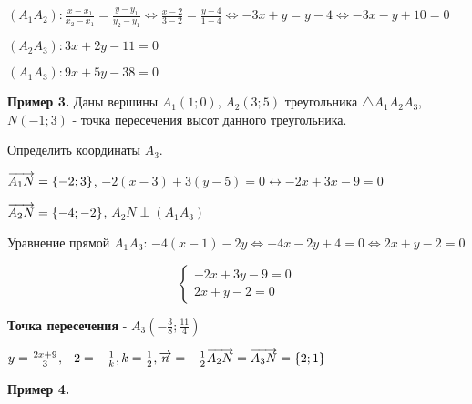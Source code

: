 \documentclass{article}
\def\vec{\ensuremath\overrightarrow}
\begin{document}
\begin{flushleft}
\hfill

$(A_1 A_2): \frac{x - x_1}{x_2 - x_1} = \frac{y - y_1}{y_2 - y_1} \Longleftrightarrow \frac{x - 2}{3 - 2} = \frac{y - 4}{1 - 4} \Longleftrightarrow -3x + y = y - 4 \Longleftrightarrow -3x - y + 10 = 0$

\hfill

$(A_2 A_3): 3x + 2y - 11 = 0$

\hfill 

$(A_1 A_3): 9x + 5y - 38 = 0$

\hfill

\textbf{Пример 3.} Даны вершины $A_1 (1; 0)$, $A_2(3; 5)$ треугольника $\triangle A_1 A_2 A_3$, $N(-1; 3)$ - точка пересечения высот данного треугольника.

Определить координаты $A_3$.

\hfill

$\vec{A_1 N} = \{ -2; 3 \}$, $-2 (x - 3) + 3 (y - 5) = 0 \longleftrightarrow -2x + 3x - 9 = 0$

$\vec{A_2 N} = \{ -4; -2 \}$, $A_2 N \perp (A_1 A_3)$

\hfill

Уравнение прямой $A_1 A_3$: $-4 (x - 1) - 2y \Longleftrightarrow -4x -2y + 4 = 0 \Longleftrightarrow 2x + y - 2 = 0$

\hfill

\begin{equation}
    \begin{cases}
        -2x + 3y - 9 = 0 \\
        2x + y - 2 = 0
    \end{cases}
\end{equation}

\textbf{Точка пересечения} - $A_3 (-\frac{3}{8}; \frac{11}{4})$ 

\hfill

$y = \frac{2x + 9}{3}, -2 = -\frac{1}{k}, k = \frac{1}{2}, \vec{n} = -\frac{1}{2} \vec{A_2 N} = \vec{A_3 N} = \{ 2; 1 \}$

\hfill

\textbf{Пример 4.} 

\end{flushleft}
\end{document}
